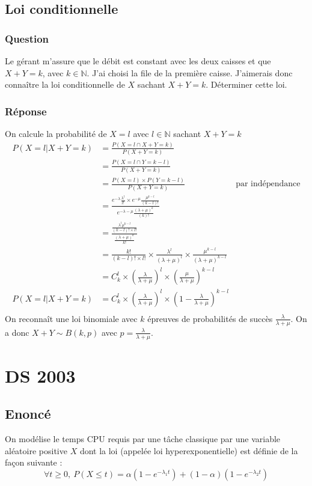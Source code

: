 \documentclass[10pt,a4paper,twoside]{article}
\begin{document}
\subsection{Loi conditionnelle}
\subsubsection*{Question}
Le gérant m'assure que le débit est constant avec les deux caisses et que $X+Y=k$, avec $k\in\mathbb{N}$. J'ai choisi la file de la première caisse. J'aimerais donc connaître la loi conditionnelle de $X$ sachant $X+Y=k$. Déterminer cette loi.

\subsubsection*{Réponse}
On calcule la probabilité de $X=l$ avec $l\in\mathbb{N}$ sachant $X+Y=k$
\begin{align*}
P(X=l|X+Y=k) &= \frac{P(X=l\cap X+Y=k)}{P(X+Y=k)}\\
&= \frac{P(X=l \cap Y=k-l)}{P(X+Y=k)}\\
&= \frac{P(X=l)\times P(Y=k-l)}{P(X+Y=k)} & \text{par indépendance}\\
&= \frac{e^{-\lambda}\frac{\lambda^{l}}{l!}\times e^{-\mu}\frac{\mu^{k-l}}{(k-l)!}}{e^{-\lambda-\mu}\frac{(\lambda+\mu)^{k}}{(k)!}}\\
&= \frac{\frac{\lambda^{l}\mu^{k-l}}{(k-l)!\times l!}}{\frac{(\lambda+\mu)^{k}}{k!}}\\
&=\frac{k!}{(k-l)!\times l!} \times \frac{\lambda^{l}}{(\lambda+\mu)^{l}} \times \frac{\mu^{k-l}}{(\lambda+\mu)^{k-l}} \\
&=C^{l}_{k}\times\left(\frac{\lambda}{\lambda+\mu}\right)^{l}\times\left(\frac{\mu}{\lambda+\mu}\right)^{k-l}\\
P(X=l|X+Y=k) &=C^{l}_{k}\times\left(\frac{\lambda}{\lambda+\mu}\right)^{l}\times\left(1-\frac{\lambda}{\lambda+\mu}\right)^{k-l}\\
\end{align*}
On reconnaît une loi binomiale avec $k$ épreuves de probabilités de succès $\frac{\lambda}{\lambda+\mu}$. On a donc $X+Y \sim B(k,p)$ avec $p=\frac{\lambda}{\lambda+\mu}$.

\section{DS 2003}
\subsection*{Enoncé}
On modélise le temps CPU requis par une tâche classique par une variable aléatoire positive $X$ dont la loi (appelée loi hyperexponentielle) est définie de la façon suivante :
\[\forall t\geqslant0,\ P(X\leqslant t)=\alpha(1-e^{-\lambda_{1}t})+(1-\alpha)(1-e^{-\lambda_{2}t}) \]
\end{document}
